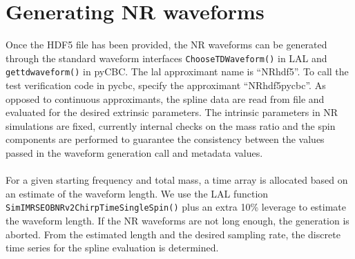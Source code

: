 \documentclass[aps,prd,amssymb,amsmath,amsfonts,superscriptaddress,
floatfix ,preprintnumbers,altaffilletter]{revtex4}
\begin{document}
\section{Generating NR waveforms}
\label{sec:gen}
Once the HDF5 file has been provided, the NR waveforms can be generated through the standard waveform interfaces \texttt{ChooseTDWaveform()} in LAL
and \texttt{get\textunderscore td\textunderscore waveform()} in pyCBC. The lal approximant name is ``NR\textunderscore hdf5''. To call the test verification code in pycbc, specify the approximant ``NR\textunderscore hdf5\textunderscore pycbc''. 
As opposed to continuous approximants, the spline data are read from file and evaluated for the desired extrinsic
parameters. The intrinsic parameters in NR simulations are fixed, currently internal checks on the mass ratio and the spin components 
are performed to guarantee the consistency between the values passed
in the waveform generation call and metadata values. \\
\\For a given starting frequency and total mass, a time array is allocated based on an estimate of the waveform length. We use the LAL function 
\texttt{SimIMRSEOBNRv2ChirpTimeSingleSpin()} plus an extra 10\% leverage to estimate the waveform length. If the NR waveforms are not long
enough, the generation is aborted. From the estimated length and the desired sampling rate, the discrete time series for the spline evaluation is
determined.
\end{document}
